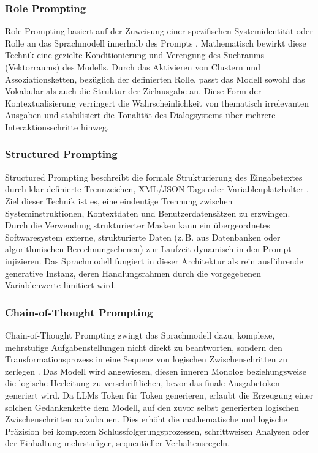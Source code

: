 \subsubsection{Role Prompting}
Role Prompting basiert auf der Zuweisung einer spezifischen Systemidentität oder Rolle an das Sprachmodell innerhalb des Prompts \citep{zhang2023visar}. Mathematisch bewirkt diese Technik eine gezielte Konditionierung und Verengung des Suchraums (Vektorraums) des Modells. Durch das Aktivieren von Clustern und Assoziationsketten, bezüglich der definierten Rolle, passt das Modell sowohl das Vokabular als auch die Struktur der Zielausgabe an. Diese Form der Kontextualisierung verringert die Wahrscheinlichkeit von thematisch irrelevanten Ausgaben und stabilisiert die Tonalität des Dialogsystems über mehrere Interaktionsschritte hinweg.

\subsubsection{Structured Prompting}
Structured Prompting beschreibt die formale Strukturierung des Eingabetextes durch klar definierte Trennzeichen, XML/JSON-Tags oder Variablenplatzhalter \citep{hao2022structured}. Ziel dieser Technik ist es, eine eindeutige Trennung zwischen Systeminstruktionen, Kontextdaten und Benutzerdatensätzen zu erzwingen. Durch die Verwendung strukturierter Masken kann ein übergeordnetes Softwaresystem externe, strukturierte Daten (z.\,B. aus Datenbanken oder algorithmischen Berechnungsebenen) zur Laufzeit dynamisch in den Prompt injizieren. Das Sprachmodell fungiert in dieser Architektur als rein ausführende generative Instanz, deren Handlungsrahmen durch die vorgegebenen Variablenwerte limitiert wird.

\subsubsection{Chain-of-Thought Prompting}
Chain-of-Thought Prompting zwingt das Sprachmodell dazu, komplexe, mehrstufige Aufgabenstellungen nicht direkt zu beantworten, sondern den Transformationsprozess in eine Sequenz von logischen Zwischenschritten zu zerlegen \citep{wei2022chain}. Das Modell wird angewiesen, diesen inneren Monolog beziehungsweise die logische Herleitung zu verschriftlichen, bevor das finale Ausgabetoken generiert wird. Da LLMs Token für Token generieren, erlaubt die Erzeugung einer solchen Gedankenkette dem Modell, auf den zuvor selbst generierten logischen Zwischenschritten aufzubauen. Dies erhöht die mathematische und logische Präzision bei komplexen Schlussfolgerungsprozessen, schrittweisen Analysen oder der Einhaltung mehrstufiger, sequentieller Verhaltensregeln.

